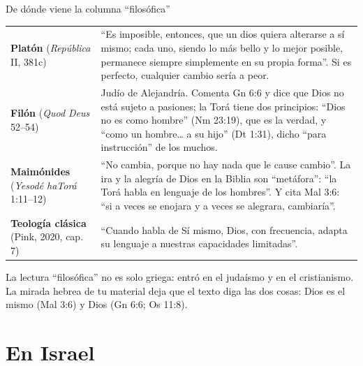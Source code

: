\begin{frame}{De dónde viene la columna ``filosófica''}
\scriptsize\renewcommand{\arraystretch}{1.18}
\begin{tabular}{@{}>{\RaggedRight\arraybackslash}p{2.6cm}>{\RaggedRight\arraybackslash}p{9.2cm}@{}}
\toprule
\textbf{Platón} (\emph{República} II, 381c) & ``Es imposible, entonces, que un dios quiera alterarse a sí mismo; cada uno, siendo lo más bello y lo mejor posible, permanece siempre simplemente en su propia forma''. Si es perfecto, cualquier cambio sería a peor. \\
\textbf{Filón} (\emph{Quod Deus} 52--54) & Judío de Alejandría. Comenta Gn 6:6 y dice que Dios no está sujeto a pasiones; la Torá tiene dos principios: ``Dios no es como hombre'' (Nm 23:19), que es la verdad, y ``como un hombre\ldots{} a su hijo'' (Dt 1:31), dicho ``para instrucción'' de los muchos. \\
\textbf{Maimónides} (\emph{Yesodé haTorá} 1:11--12) & ``No cambia, porque no hay nada que le cause cambio''. La ira y la alegría de Dios en la Biblia son ``metáfora'': ``la Torá habla en lenguaje de los hombres''. Y cita Mal 3:6: ``si a veces se enojara y a veces se alegrara, cambiaría''. \\
\textbf{Teología clásica} (Pink, 2020, cap. 7) & ``Cuando habla de Sí mismo, Dios, con frecuencia, adapta su lenguaje a nuestras capacidades limitadas''. \\
\bottomrule
\end{tabular}\par\medskip
\small\RaggedRight La lectura ``filosófica'' no es solo griega: entró en el judaísmo y en el cristianismo. La mirada hebrea de tu material deja que el texto diga las dos cosas: Dios es el mismo (Mal 3:6) y Dios  (Gn 6:6; Os 11:8).\par\smallskip
{}
\end{frame}

\section{En Israel}

